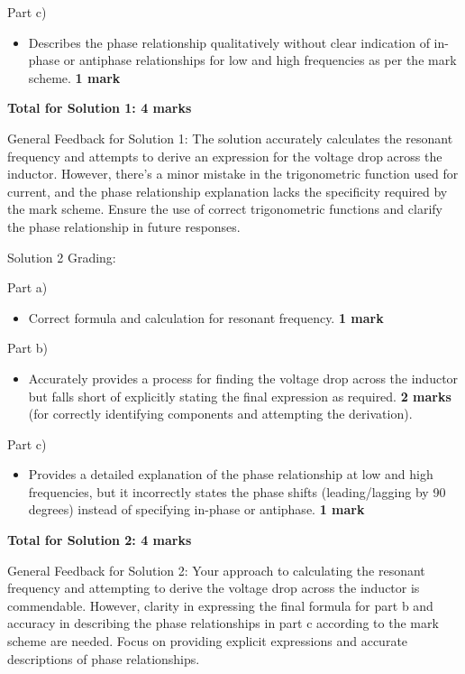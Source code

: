 \documentclass[a4paper,11pt]{article}
\begin{document}
Part c)

\begin{itemize}
    \item Describes the phase relationship qualitatively without clear indication of in-phase or antiphase relationships for low and high frequencies as per the mark scheme. \textbf{1 mark}
\end{itemize}

\textbf{Total for Solution 1: 4 marks}

General Feedback for Solution 1: The solution accurately calculates the resonant frequency and attempts to derive an expression for the voltage drop across the inductor. However, there's a minor mistake in the trigonometric function used for current, and the phase relationship explanation lacks the specificity required by the mark scheme. Ensure the use of correct trigonometric functions and clarify the phase relationship in future responses.

Solution 2 Grading:

Part a)

\begin{itemize}
    \item Correct formula and calculation for resonant frequency. \textbf{1 mark}
\end{itemize}

Part b)

\begin{itemize}
    \item Accurately provides a process for finding the voltage drop across the inductor but falls short of explicitly stating the final expression as required. \textbf{2 marks} (for correctly identifying components and attempting the derivation).
\end{itemize}

Part c)

\begin{itemize}
    \item Provides a detailed explanation of the phase relationship at low and high frequencies, but it incorrectly states the phase shifts (leading/lagging by 90 degrees) instead of specifying in-phase or antiphase. \textbf{1 mark}
\end{itemize}

\textbf{Total for Solution 2: 4 marks}

General Feedback for Solution 2: Your approach to calculating the resonant frequency and attempting to derive the voltage drop across the inductor is commendable. However, clarity in expressing the final formula for part b and accuracy in describing the phase relationships in part c according to the mark scheme are needed. Focus on providing explicit expressions and accurate descriptions of phase relationships.
\end{document}
